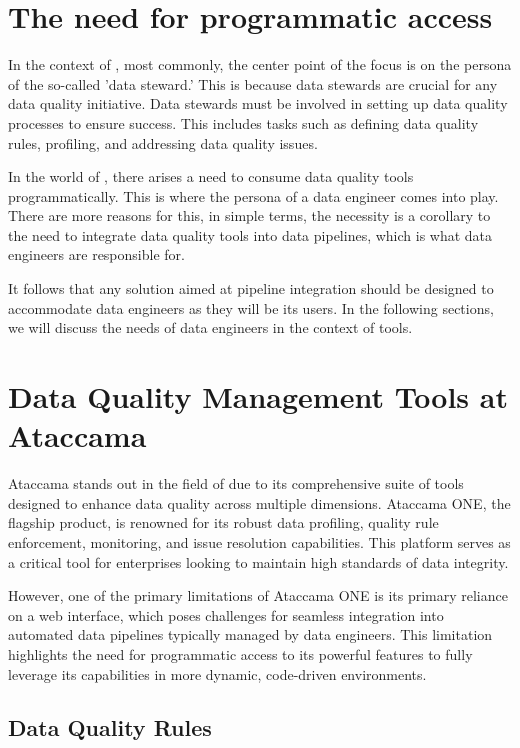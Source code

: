 \section*{The need for programmatic access}

In the context of , most commonly, the center point of the focus is on the persona of the so-called 'data steward.' \cite{data_stewards} This is because data stewards are crucial
for any data quality initiative. Data stewards must be involved in setting up data quality processes to ensure success. This includes tasks such as defining data quality rules,
profiling, and addressing data quality issues. 

In the world of , there arises a need to consume data quality tools programmatically. This is where the persona of a data engineer comes into play. There are more reasons for this, in simple terms,
the necessity is a corollary to the need to integrate data quality tools into data pipelines, which is what data engineers are responsible for.

 It follows that any solution aimed at pipeline integration should be designed to accommodate data engineers as they will be its users. In the following sections, we will discuss the needs of data engineers in the context of  tools.

 \section*{Data Quality Management Tools at Ataccama}

 Ataccama stands out in the field of  due to its comprehensive suite of tools designed to enhance data quality across multiple dimensions. Ataccama ONE, the flagship product, is renowned for its robust data profiling, quality rule enforcement, monitoring, and issue resolution capabilities. This platform serves as a critical tool for enterprises looking to maintain high standards of data integrity.
 
 However, one of the primary limitations of Ataccama ONE is its primary reliance on a web interface, which poses challenges for seamless integration into automated data pipelines typically managed by data engineers. This limitation highlights the need for programmatic access to its powerful  features to fully leverage its capabilities in more dynamic, code-driven environments.
 
 \subsection*{Data Quality Rules}
 
